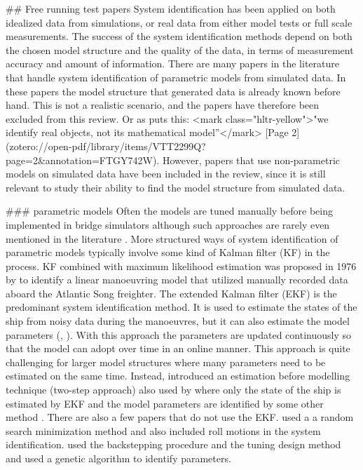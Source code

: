 ## Free running test papers
System identification has been applied on both idealized data from simulations, or real data from either model tests or full scale measurements. The success of the system identification methods depend on both the chosen model structure and the quality of the data, in terms of measurement accuracy and amount of information. 
There are many papers in the literature that handle system identification of parametric models from simulated data. 
In these papers the model structure that generated data is already known before hand. This is not a realistic scenario, and the papers have therefore been excluded from this review. Or as \cite{millerShipModelIdentification2021} puts this: <mark class="hltr-yellow">"we identify real objects, not its mathematical model”</mark> [Page 2](zotero://open-pdf/library/items/VTT2299Q?page=2&annotation=FTGY742W). However, papers that use non-parametric models on simulated data have been included in the review, since it is still relevant to study their ability to find the model structure from simulated data.

### parametric models
Often the models are tuned manually before being implemented in bridge simulators although such approaches are rarely even mentioned in the literature \cite{sutuloAlgorithmOfflineIdentification2014}. More structured ways of system identification of parametric models typically involve some kind of Kalman filter (KF) in the process. KF combined with maximum likelihood estimation was proposed in 1976 by \cite{astromIdentificationShipSteering1976} to identify a linear manoeuvring model that utilized manually recorded data aboard the Atlantic Song freighter. The extended Kalman filter (EKF) is the predominant system identification method. It is used to estimate the states of the ship from noisy data during the manoeuvres, but it can also estimate the model parameters (\cite{shiIdentificationShipManeuvering2009}, \cite{pereraSystemIdentificationNonlinear2015}). With this approach the parameters are updated continuously so that the model can adopt over time in an online manner. This approach is quite challenging for larger model structures where many parameters need to be estimated on the same time. Instead, \cite{yoonIdentificationHydrodynamicCoefficients2003} introduced an estimation before modelling technique  (two-step approach) also used by \cite{revestidoherreroTwostepIdentificationNonlinear2012} where only the state of the ship is estimated by EKF and the model parameters are identified by some other method .  
There are also a few papers that do not use the EKF. \cite{tianoMultivariableIdentificationShip1997} used a a random search minimization method and also included roll motions in the system identification. \cite{casadoIdentificationNonlinearShip2005} used the backstepping procedure and the tuning design method and \cite{millerShipModelIdentification2021} used a genetic algorithm   to identify parameters.

